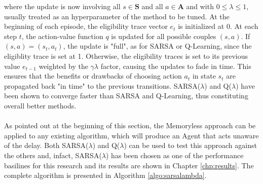                 where the update is now involving all $s \in \mathbf{S}$ and all $a \in \mathbf{A}$ and with $ 0 \leq \lambda \leq 1$, usually treated as an hyperparameter of the method to be tuned. At the beginning of each episode, the eligibility trace vector $e_t$ is initialized at 0. At each step $t$, the action-value function $q$ is updated for all possible couples $(s, a)$. If $(s, a) = (s_t, a_t)$, the update is "full", as for SARSA or Q-Learning, since the eligiblity trace is set at 1. Otherwise, the eligibility traces is set to its previous value $e_{t-1}$ weighted by the $\gamma \lambda$ factor, causing the updates to fade in time. This ensures that the benefits or drawbacks of choosing action $a_t$ in state $s_t$ are propagated back "in time" to the previous transitions. SARSA($\lambda$) and Q($\lambda$) have been shown to converge faster than SARSA and Q-Learning, thus constituting overall better methods.
                \\\\
                As pointed out at the beginning of this section, the Memoryless approach can be applied to any existing algorithm, which will produce an Agent that acts unaware of the delay. Both SARSA($\lambda$) and Q($\lambda$) can be used to test this approach against the others and, infact, SARSA($\lambda$) has been chosen as one of the performance basilines for this research and its results are shown in Chapter \ref{chp:results}. The complete algorithm is presented in Algorithm \ref{algo:sarsalambda}.
                
